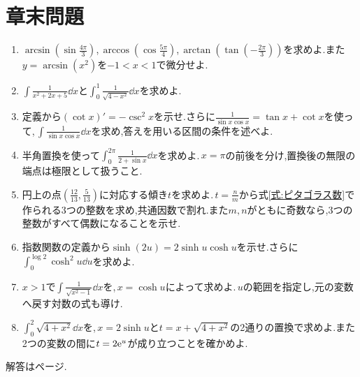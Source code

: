 \section*{章末問題}
\begin{enumerate}[label=\textbf{\thechapter.\arabic*},leftmargin=*]
\item\label{問:逆三角関数の枝}
$\arcsin(\sin\frac{4\pi}3)$,\,$\arccos(\cos\frac{5\pi}4)$,\,$\arctan(\tan(-\frac{2\pi}3))$を求めよ.また$y=\arcsin(x^2)$を$-1<x<1$で微分せよ.
\item\label{問:逆三角関数の積分練習}
$\int\frac1{x^2+2x+5}\dd x$と$\int_0^1\frac1{\sqrt{4-x^2}}\dd x$を求めよ.
\item\label{問:余接と正接の和}
定義から$(\cot x)'=-\csc^2x$を示せ.さらに$\frac1{\sin x\cos x}=\tan x+\cot x$を使って,\,$\int\frac1{\sin x\cos x}\dd x$を求め,答えを用いる区間の条件を述べよ.
\item\label{問:半角置換の区間分割}
半角置換を使って$\int_0^{2\pi}\frac1{2+\sin x}\dd x$を求めよ.\,$x=\pi$の前後を分け,置換後の無限の端点は極限として扱うこと.
\item\label{問:円の点とピタゴラス数}
円上の点$\left(\frac{12}{13},\frac5{13}\right)$に対応する傾き$t$を求めよ.\,$t=\frac nm$から式\eqref{式:ピタゴラス数}で作られる3つの整数を求め,共通因数で割れ.また$m,n$がともに奇数なら,3つの整数がすべて偶数になることを示せ.
\item\label{問:双曲線二倍角と積分}
指数関数の定義から$\sinh(2u)=2\sinh u\cosh u$を示せ.さらに$\int_0^{\log2}\cosh^2u\dd u$を求めよ.
\item\label{問:双曲線余弦の置換}
$x>1$で$\int\frac1{\sqrt{x^2-1}}\dd x$を,\,$x=\cosh u$によって求めよ.\,$u$の範囲を指定し,元の変数へ戻す対数の式も導け.
\item\label{問:双曲線置換と代数置換}
$\int_0^2\sqrt{4+x^2}\dd x$を,\,$x=2\sinh u$と$t=x+\sqrt{4+x^2}$の2通りの置換で求めよ.また2つの変数の間に$t=2\mathrm{e}^u$が成り立つことを確かめよ.
\end{enumerate}

\smallskip\noindent 解答は\pageref{解答:第11章}ページ.

